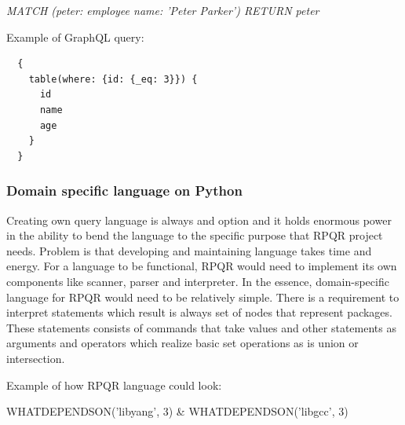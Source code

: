 \textit{MATCH (peter: employee {name: 'Peter Parker'}) RETURN peter}

Example of GraphQL query:

\begin{lstlisting}
  {
    table(where: {id: {_eq: 3}}) {
      id
      name
      age
    }
  }
\end{lstlisting}

\subsubsection*{Domain specific language on Python}
Creating own query language is always and option and it holds enormous power in the ability to
bend the language to the specific purpose that RPQR project needs. Problem is that developing
and maintaining language takes time and energy. For a language to be functional, RPQR would
need to implement its own components like scanner, parser and interpreter. In the essence,
domain-specific language for RPQR would need to be relatively simple. There is a requirement
to interpret statements which result is always set of nodes that represent packages. These
statements consists of commands that take values and other statements as arguments and operators
which realize basic set operations as is union or intersection.

Example of how RPQR language could look:

WHATDEPENDSON('libyang', 3) \& WHATDEPENDSON('libgcc', 3)

\newpage

